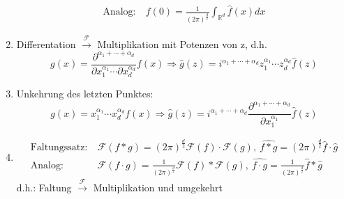 \documentclass{article}
\theoremstyle{plain}
\theoremstyle{definition}
\numberwithin{equation}{section}
\newcommand{\R}[0] {
\mathbb R
}
\begin{document}
\begin{enumerate}[label = \roman *)]
\begin{align*}
            \text{Analog:} \ & \displaystyle f(0) = \frac{1}{(2 \pi )^\frac{d}{2}} \int_{\R^d} \hat f(x) dx
        \end{align*}
        \item Differentation $\overset{\mathcal F}{\to}$ Multiplikation mit Potenzen von z, d.h.
        \begin{equation*}
            g(x) = \frac{\partial^{\alpha_1 + \cdots + \alpha_d}}{\partial x_1^{\alpha_1} \cdots \partial x_d^{\alpha_d}} f(x) \Rightarrow \hat g(z) = i^{\alpha_1 + \cdots + \alpha_d} z_1^{\alpha_1} \cdots z_d^{\alpha_d} \hat f(z)
        \end{equation*}
        \item Unkehrung des letzten Punktes:
        \begin{equation*}
            g(x) = x_1^{\alpha_1} \cdots x_d^{\alpha_d} f(x) \Rightarrow \hat g(z) = i^{\alpha_1 + \cdots + \alpha_d}  \frac{\partial^{\alpha_1 + \cdots + \alpha_d}}{\partial x_1^{\alpha_1}} \hat f(z)
        \end{equation*}
        \item
        \begin{align*}
            \text{Faltungssatz:} \  & \mathcal F(f*g) = (2 \pi)^{\frac{d}{2}} \mathcal F(f) \cdot \mathcal F(g), \ \widehat{f*g}=(2 \pi)^{\frac{d}{2}} \hat f \cdot \hat g\\
            \text{Analog:} \ & \mathcal F (f \cdot g) = \frac{1}{(2 \pi)^{\frac{d}{2}}} \mathcal F(f) * \mathcal F(g), \ \widehat{f \cdot g} = \frac{1}{(2\pi)^{\frac{d}{2}}} \hat f * \hat g
        \end{align*}
        d.h.: Faltung $\overset{\mathcal F}{\to}$ Multiplikation und umgekehrt
    \end{enumerate}
\end{document}
